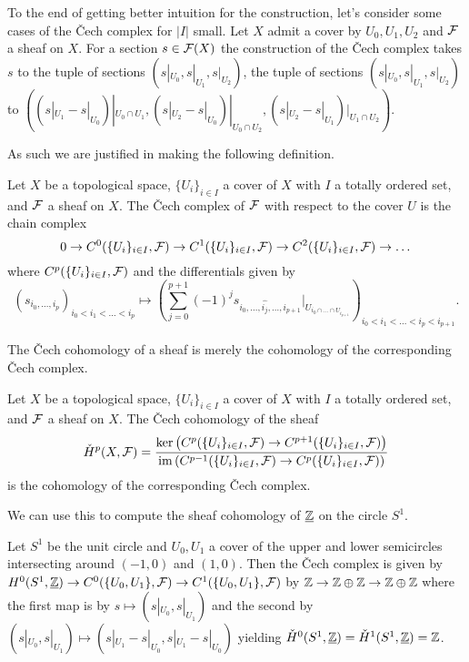 \begin{remark}
    To the end of getting better intuition for the construction, let's consider some cases of the \v{C}ech complex for $|I|$ small. Let $X$ admit a cover by $U_{0},U_{1},U_{2}$ and $\mathcal{F}$ a sheaf on $X$. For a section $s\in\mathcal{F}(X)$ the construction of the \v{C}ech complex takes $s$ to the tuple of sections $(s|_{U_{0}},s|_{U_{1}},s|_{U_{2}})$, the tuple of sections $(s|_{U_{0}},s|_{U_{1}},s|_{U_{2}})$ to $((s|_{U_{1}}-s|_{U_{0}})|_{U_{0}\cap U_{1}}, (s|_{U_{2}}-s|_{U_{0}})|_{U_{0}\cap U_{2}}, (s|_{U_{2}}-s|_{U_{1}})|_{U_{1}\cap U_{2}})$.
\end{remark}
As such we are justified in making the following definition. 
\begin{definition}\label{def: Cech complex}
    Let $X$ be a topological space, $\{U_{i}\}_{i\in I}$ a cover of $X$ with $I$ a totally ordered set, and $\mathcal{F}$ a sheaf on $X$. The \v{C}ech complex of $\mathcal{F}$ with respect to the cover $U$ is the chain complex 
    $$0\to C^{0}(\{U_{i}\}_{i\in I},\mathcal{F})\to C^{1}(\{U_{i}\}_{i\in I},\mathcal{F})\to C^{2}(\{U_{i}\}_{i\in I},\mathcal{F})\to\dots$$
    where $C^{p}(\{U_{i}\}_{i\in I},\mathcal{F})$ and the differentials given by 
    $$(s_{i_{0},\dots,i_{p}})_{i_{0}<i_{1}<\dots<i_{p}}\mapsto\left(\sum_{j=0}^{p+1}(-1)^{j}s_{i_{0},\dots,\widehat{i_{j}},\dots,i_{p+1}}|_{U_{i_{0}\cap\dots \cap U_{i_{p+1}}}}\right)_{i_{0}<i_{1}<\dots<i_{p}<i_{p+1}}.$$
\end{definition}
The \v{C}ech cohomology of a sheaf is merely the cohomology of the corresponding \v{C}ech complex. 
\begin{definition}\label{def: Cech cohomology}
    Let $X$ be a topological space, $\{U_{i}\}_{i\in I}$ a cover of $X$ with $I$ a totally ordered set, and $\mathcal{F}$ a sheaf on $X$. The \v{C}ech cohomology of the sheaf 
    $$\check{H}^{p}(X,\mathcal{F})=\frac{\ker\left(C^{p}(\{U_{i}\}_{i\in I},\mathcal{F})\to C^{p+1}(\{U_{i}\}_{i\in I},\mathcal{F})\right)}{\mathrm{im}\left(C^{p-1}(\{U_{i}\}_{i\in I},\mathcal{F})\to C^{p}(\{U_{i}\}_{i\in I},\mathcal{F})\right)}$$
    is the cohomology of the corresponding \v{C}ech complex. 
\end{definition}
We can use this to compute the sheaf cohomology of $\underline{\mathbb{Z}}$ on the circle $S^{1}$. 
\begin{example}
    Let $S^{1}$ be the unit circle and $U_{0},U_{1}$ a cover of the upper and lower semicircles intersecting around $(-1,0)$ and $(1,0)$. Then the \v{C}ech complex is given by $H^{0}(S^{1},\underline{\mathbb{Z}})\to C^{0}(\{U_{0},U_{1}\},\mathcal{F})\to C^{1}(\{U_{0},U_{1}\},\mathcal{F})$ by $\mathbb{Z}\to\mathbb{Z}\oplus\mathbb{Z}\to\mathbb{Z}\oplus\mathbb{Z}$ where the first map is by $s\mapsto (s|_{U_{0}},s|_{U_{1}})$ and the second by $(s|_{U_{0}},s|_{U_{1}})\mapsto (s|_{U_{1}}-s|_{U_{0}},s|_{U_{1}}-s|_{U_{0}})$ yielding $\check{H}^{0}(S^{1},\underline{\mathbb{Z}})=\check{H}^{1}(S^{1},\underline{\mathbb{Z}})=\mathbb{Z}$. 
\end{example}
